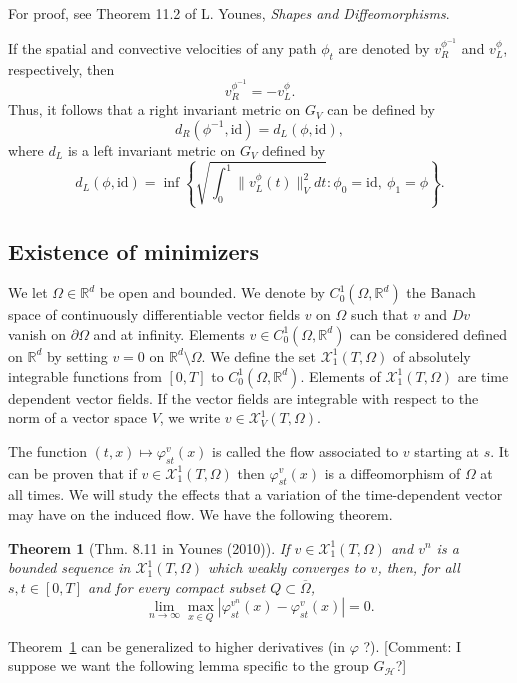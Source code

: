\documentclass{article}
\theoremstyle{plain}
\newtheorem{teo}{Theorem}[section]
\theoremstyle{definition}
\numberwithin{equation}{section}
\newcommand{\R}{\ensuremath{\mathbb{R}}}
\newcommand{\id}{\ensuremath{\mathrm{id}}}
\begin{document}
For proof, see Theorem 11.2 of L. Younes, \textit{Shapes and Diffeomorphisms}.

If the spatial and convective velocities of any path $\phi_t$ are denoted by $v_R^{\phi^{-1}}$ and $v_L^\phi$, respectively, then 
\[
v_R^{\phi^{-1}}=-v_L^\phi.
\]
Thus, it follows that a right invariant metric on $G_V$ can be defined by
\[
d_R(\phi^{-1},\id)=d_L(\phi,\id),
\]
where $d_L$ is a left invariant metric on $G_V$ defined by
\[
 d_L(\phi,\id)=\inf\left\{\sqrt{\int_0^1\|v_L^\phi(t)\|_V^2 dt}: \phi_0=\id,\ \phi_1=\phi \right\}.
\]

\subsection{Existence of minimizers}
We let $\Omega\in\R^d$ be open and bounded. We denote by $C^1_0(\Omega,\R^d)$ the Banach space of continuously differentiable vector fields $v$  on $\Omega$ such that $v$ and $Dv$ vanish on $\partial\Omega$ and at infinity. Elements $v\in C^1_0(\Omega,\R^d)$ can be considered defined on $\R^d$ by setting $v=0$ on $\R^d\setminus\Omega$. We define the set $\mathcal{X}_1^1(T,\Omega)$ of absolutely integrable functions from $[0,T]$ to $C^1_0(\Omega,\R^d)$. Elements of $\mathcal{X}_1^1(T,\Omega)$ are time dependent vector fields. If the vector fields are integrable with respect to the norm of a vector space $V$, we write $v\in \mathcal{X}_V^1(T,\Omega)$.

The function $(t,x)\mapsto \varphi^v_{st}(x)$ is called the flow associated to $v$ starting at $s$. It can be proven that if $v\in\mathcal{X}_1^1(T,\Omega)$ then $\varphi^v_{st}(x)$ is a diffeomorphism of $\Omega$ at all times. We will study the effects that a variation of the time-dependent vector may have on the induced flow. We have the following theorem.

\begin{teo}[Thm. 8.11 in Younes (2010)]
\label{teo:811}
If $v\in\mathcal{X}_1^1(T,\Omega)$ and $v^n$ is a bounded sequence in $\mathcal{X}_1^1(T,\Omega)$ which weakly converges to $v$, then, for all $s,t\in[0,T]$ and for every compact subset $Q\subset \overline{\Omega}$,
\[
\lim_{n\to\infty} \max_{x\in Q} |\varphi_{st}^{v^n}(x)-\varphi_{st}^{v}(x)|=0.
\]
\end{teo}

Theorem~\ref{teo:811} can be generalized to higher derivatives (in $\varphi$ ?). [Comment: I suppose we want the following lemma specific to the group $G_\mathcal{H}$?]
\end{document}
